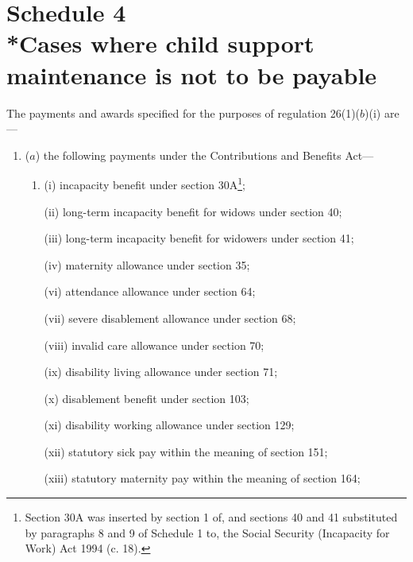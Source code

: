 \documentclass[12pt,a4paper]{article}
\begin{document}
\part[Schedule 4 --- Cases where child support maintenance is not to be payable]{Schedule 4\\*Cases where child support maintenance is not to be payable}

\renewcommand\parthead{--- Schedule 4}

The payments and awards specified for the purposes of regulation 26(1)($b$)(i) are—
\begin{enumerate}\item[]
($a$) the following payments under the Contributions and Benefits Act—
\begin{enumerate}\item[]
%
%

(i) incapacity benefit under section 30A\footnote{\frenchspacing Section 30A was inserted by section 1 of, and sections 40 and 41 substituted by paragraphs 8 and 9 of Schedule 1 to, the Social Security (Incapacity for Work) Act 1994 (c. 18).};

(ii) long-term incapacity benefit for widows under section 40;

(iii) long-term incapacity benefit for widowers under section 41;

(iv) maternity allowance under section 35;


(vi) attendance allowance under section 64;

(vii) severe disablement allowance under section 68;

(viii) invalid care allowance under section 70;

(ix) disability living allowance under section 71;

(x) disablement benefit under section 103;

(xi) disability working allowance under section 129;

(xii) statutory sick pay within the meaning of section 151;

(xiii) statutory maternity pay within the meaning of section 164;
\end{enumerate}


\end{enumerate}
\end{document}
